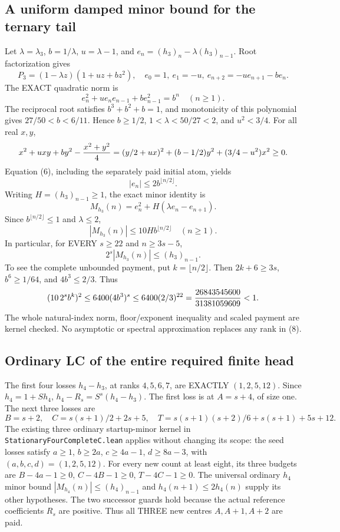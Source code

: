 \subsection{A uniform damped minor bound for the ternary tail}
Let $\lambda=\lambda_3$, $b=1/\lambda$, $u=\lambda-1$, and
$e_n=(h_3)_n-\lambda(h_3)_{n-1}$. Root factorization gives
\[
 P_3=(1-\lambda z)(1+uz+bz^2),\quad
 e_0=1,\ e_1=-u,\ e_{n+2}=-ue_{n+1}-be_n.
\]
The EXACT quadratic norm is
\[
 e_n^2+ue_ne_{n-1}+be_{n-1}^2=b^n\quad(n\ge1).             \tag{6}
\]
The reciprocal root satisfies $b^3+b^2+b=1$, and monotonicity of
this polynomial gives $27/50<b<6/11$. Hence $b\ge1/2$,
$1<\lambda<50/27<2$, and $u^2<3/4$.
For all real $x,y$,
\[
 x^2+uxy+by^2-{x^2+y^2\over4}
 =(y/2+ux)^2+(b-1/2)y^2+(3/4-u^2)x^2\ge0.
\]
Equation (6), including the separately paid initial atom, yields
\[
                    |e_n|\le2b^{\lfloor n/2\rfloor}.
\]
Writing $H=(h_3)_{n-1}\ge1$, the exact minor identity is
\[
 M_{h_3}(n)=e_n^2+H(\lambda e_n-e_{n+1}).
\]
Since $b^{\lfloor n/2\rfloor}\le1$ and $\lambda\le2$,
\[
             |M_{h_3}(n)|\le10H b^{\lfloor n/2\rfloor}
                         \quad(n\ge1).                   \tag{7}
\]
In particular, for EVERY $s\ge22$ and $n\ge3s-5$,
\[
                        2^s|M_{h_3}(n)|\le(h_3)_{n-1}.    \tag{8}
\]
To see the complete unbounded payment, put $k=\lfloor n/2\rfloor$.
Then $2k+6\ge3s$, $b^6\ge1/64$, and $4b^3\le2/3$. Thus
\[
 (10\,2^s b^k)^2\le6400(4b^3)^s
 \le6400(2/3)^{22}={26843545600\over31381059609}<1.
\]
The whole natural-index norm, floor/exponent inequality and scaled
payment are kernel checked. No asymptotic or spectral approximation
replaces any rank in (8).

\subsection{Ordinary LC of the entire required finite head}
The first four losses $h_4-h_3$, at ranks $4,5,6,7$, are
EXACTLY $(1,2,5,12)$. Since $h_4=1+Sh_4$,
$h_4-R_s=S^s(h_4-h_3)$. The first loss is at $A=s+4$, of size one.
The next three losses are
\[
 B=s+2,\quad C=s(s+1)/2+2s+5,\quad
 T=s(s+1)(s+2)/6+s(s+1)+5s+12.                            \tag{9}
\]
The existing three ordinary startup-minor kernel in
\texttt{StationaryFourCompleteC.lean} applies without changing its
scope: the seed losses satisfy $a\ge1$, $b\ge2a$,
$c\ge4a-1$, $d\ge8a-3$, with $(a,b,c,d)=(1,2,5,12)$.
For every new count at least eight, its three budgets are
$B-4a-1\ge0$, $C-4B-1\ge0$, $T-4C-1\ge0$.
The universal ordinary $h_4$ minor bound $|M_{h_4}(n)|\le(h_4)_{n-1}$
and $h_4(n+1)\le2h_4(n)$ supply its other hypotheses.
The two successor guards hold because the actual reference coefficients
$R_s$ are positive. Thus all THREE new centres $A,A+1,A+2$ are paid.

